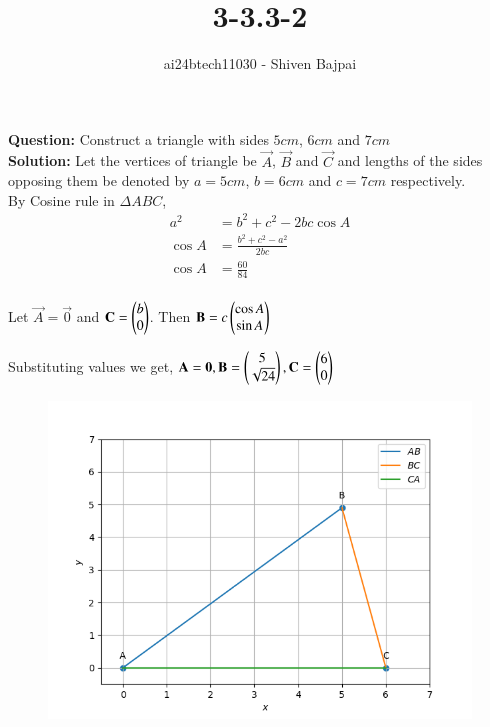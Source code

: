 \documentclass[journal]{IEEEtran}
\begin{document}
\onecolumn

\vspace{3cm}

\renewcommand{\thefigure}{\theenumi}
\renewcommand{\thetable}{\theenumi}

\title{3-3.3-2}
\author{ai24btech11030 - Shiven Bajpai}
\maketitle

\renewcommand{\thefigure}{\theenumi}
\renewcommand{\thetable}{\theenumi}

\textbf{Question: } Construct a triangle with sides $5cm$, $6cm$ and $7cm$
\\

\textbf{Solution: } Let the vertices of triangle be $\vec{A}$, $\vec{B}$ and $\vec{C}$ and lengths of the sides opposing them be denoted by $a = 5cm$, $b = 6cm$ and $c = 7cm$ respectively.
\\

By Cosine rule in $\Delta ABC$,
\begin{align*}
	a^2 &= b^2 + c^2 - 2bc \cos A\\
	\cos A &= \frac{b^2 + c^2 - a^2}{2bc}\\
	\cos A &= \frac{60}{84}\\
\end{align*}

Let $\vec{A} = \vec{0}$ and $\mathbf{C} = \begin{pmatrix}b \\ 0\end{pmatrix}$. Then $\mathbf{B} = c\begin{pmatrix}\cos A \\ \sin A\end{pmatrix}$

Substituting values we get, $\mathbf{A} = \mathbf{0}, \mathbf{B} = \begin{pmatrix}5 \\ \sqrt{24}\end{pmatrix}, \mathbf{C} = \begin{pmatrix}6 \\ 0\end{pmatrix}$

\begin{figure}[H]
	\centering
	\includegraphics[width=0.75\columnwidth]{Figures/Figure.png}
	\label{fig}
\end{figure}
\end{document}
